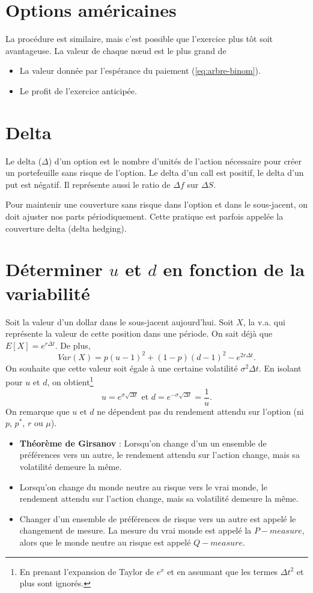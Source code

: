 \section{Options américaines}

La procédure est similaire, mais c'est possible que l'exercice plus tôt soit avantageuse. La valeur de chaque nœud est le plus grand de
\begin{itemize}
	\item La valeur donnée par l'espérance du paiement (\ref{eq:arbre-binom}).
	\item Le profit de l'exercice anticipée. 
\end{itemize}

\section{Delta}

Le delta ($\Delta$) d'un option est le nombre d'unités de l'action nécessaire pour créer un portefeuille sans risque de l'option. Le delta d'un call est positif, le delta d'un put est négatif. Il représente aussi le ratio de $\Delta f$ sur $\Delta S$. 

Pour maintenir une couverture sans risque dans l'option et dans le sous-jacent, on doit ajuster nos parts périodiquement. Cette pratique est parfois appelée la couverture delta (delta hedging). 

\section{Déterminer $u$ et $d$ en fonction de la variabilité}

Soit la valeur d'un dollar dans le sous-jacent aujourd'hui. Soit $X$, la v.a. qui représente la valeur de cette position dans une période. On sait déjà que $E[X] = e^{r\Delta t}$. De plus, 
$$Var(X) = p(u-1)^2 + (1-p)(d-1)^2 - e^{2r\Delta t}.$$ 
On souhaite que cette valeur soit égale à une certaine volatilité $\sigma^2 \Delta t$. En isolant pour $u$ et $d$, on obtient\footnote{En prenant l'expansion de Taylor de $e^x$ et en assumant que les termes $\Delta t^2$ et plus sont ignorés.}
$$u = e^{\sigma \sqrt{\Delta t}} \text{  et  } d = e^{-\sigma \sqrt{\Delta t}} = \frac{1}{u}.$$
On remarque que $u$ et $d$ ne dépendent pas du rendement attendu sur l'option (ni $p$, $p^*$, $r$ ou $\mu$).

\begin{itemize}
	\item \textbf{Théorème de Girsanov} : Lorsqu'on change d'un un ensemble de préférences vers un autre, le rendement attendu sur l'action change, mais sa volatilité demeure la même.
	\item Lorsqu'on change du monde neutre au risque vers le vrai monde, le rendement attendu sur l'action change, mais sa volatilité demeure la même.
	\item Changer d'un ensemble de préférences de risque vers un autre est appelé le changement de mesure. La mesure du vrai monde est appelé la $P-measure$, alors que le monde neutre au risque est appelé $Q-measure$.
\end{itemize}

